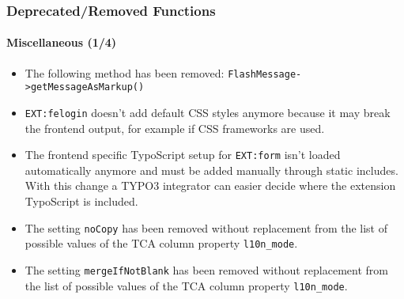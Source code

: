 \begin{frame}[fragile]
	\frametitle{Deprecated/Removed Functions}
	\framesubtitle{Miscellaneous (1/4)}


	\begin{itemize}
		\item The following method has been removed:\newline
			\small\texttt{FlashMessage->getMessageAsMarkup()}\normalsize
		\item \texttt{EXT:felogin} doesn't add default CSS styles anymore because it may
			break the frontend output, for example if CSS frameworks are used.
		\item The frontend specific TypoScript setup for \texttt{EXT:form} isn't loaded
			automatically anymore and must be added manually through static includes.
			With this change a TYPO3 integrator can easier decide where the extension TypoScript is included.
		\item The setting \texttt{noCopy} has been removed without replacement from the
			list of possible values of the TCA column property \texttt{l10n\_mode}.
		\item The setting \texttt{mergeIfNotBlank} has been removed without replacement
			from the list of possible values of the TCA column property \texttt{l10n\_mode}.

	\end{itemize}

\end{frame}



